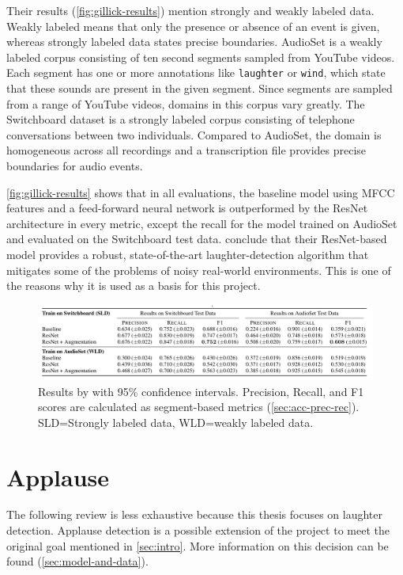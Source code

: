 \documentclass[bsc,frontabs,parskip,deptreport]{infthesis}
\begin{document}
Their results (\autoref{fig:gillick-results}) mention strongly and weakly labeled data.
Weakly labeled means that only the presence or absence of an event is given, whereas strongly labeled data states precise boundaries.
AudioSet \citep{googleaudioset} is a weakly labeled corpus consisting of ten second segments sampled from YouTube videos. Each segment has one or more annotations like \texttt{laughter} or \texttt{wind}, which state that these sounds are present in the given segment. Since segments are sampled from a range of YouTube videos, domains in this corpus vary greatly.
The Switchboard dataset is a strongly labeled corpus consisting of telephone conversations between two individuals. Compared to AudioSet, the domain is homogeneous across all recordings and a transcription file provides precise boundaries for audio events.

\autoref{fig:gillick-results} shows that in all evaluations, the baseline model using MFCC features and a feed-forward neural network is outperformed by the ResNet architecture in every metric, except the recall for the model trained on AudioSet and evaluated on the Switchboard test data. 
\citet{gillick2021robust} conclude that their ResNet-based model provides a robust, state-of-the-art laughter-detection algorithm that mitigates some of the problems of noisy real-world environments. This is one of the reasons why it is used as a basis for this project.

\begin{figure}[h!]
    \centering
    \includegraphics[width=14cm]{imgs/results/gillick_et_al.png}
    \caption{Results by \citet{gillick2021robust} with 95\% confidence intervals. Precision, Recall, and F1 scores are calculated as segment-based metrics (\autoref{sec:acc-prec-rec}). SLD=Strongly labeled data, WLD=weakly labeled data.}
    \label{fig:gillick-results}
\end{figure}

\section{Applause}
The following review is less exhaustive because this thesis focuses on laughter detection. Applause detection is a possible extension of the project to meet the original goal mentioned in \autoref{sec:intro}. 
More information on this decision can be found (\autoref{sec:model-and-data}).
\end{document}
